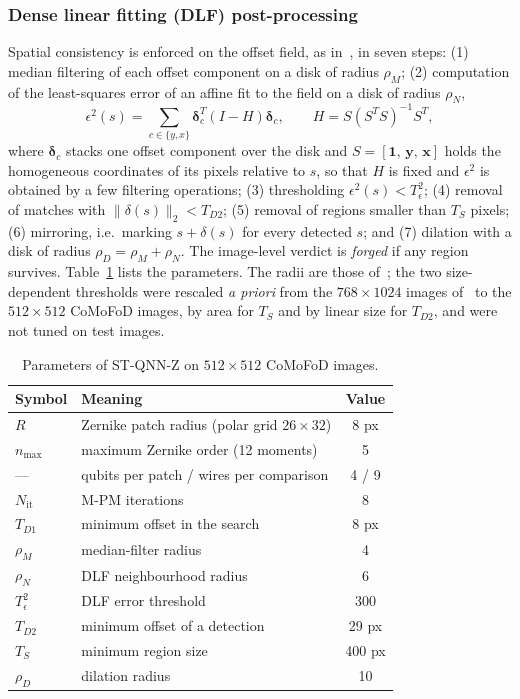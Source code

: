 \documentclass[conference]{IEEEtran}
\begin{document}
\subsubsection{Dense linear fitting (DLF) post-processing}
Spatial consistency is enforced on the offset field, as in~\cite{cozzolino2015}, in seven steps: (1) median filtering of each offset component on a disk of radius $\rho_M$; (2) computation of the least-squares error of an affine fit to the field on a disk of radius $\rho_N$,
\begin{equation}
\epsilon^2(s) = \sum_{c\in\{y,x\}} \boldsymbol{\delta}_c^{T}\left(I - H\right)\boldsymbol{\delta}_c,\qquad H = S\left(S^TS\right)^{-1}S^T,
\label{eq:dlf}
\end{equation}
where $\boldsymbol{\delta}_c$ stacks one offset component over the disk and $S = [\mathbf{1},\, \mathbf{y},\, \mathbf{x}]$ holds the homogeneous coordinates of its pixels relative to $s$, so that $H$ is fixed and $\epsilon^2$ is obtained by a few filtering operations; (3) thresholding $\epsilon^2(s) < T_\epsilon^2$; (4) removal of matches with $\|\delta(s)\|_2 < T_{D2}$; (5) removal of regions smaller than $T_S$ pixels; (6) mirroring, i.e.\ marking $s+\delta(s)$ for every detected $s$; and (7) dilation with a disk of radius $\rho_D = \rho_M + \rho_N$. The image-level verdict is \emph{forged} if any region survives. Table~\ref{tab:zparams} lists the parameters. The radii are those of~\cite{cozzolino2015}; the two size-dependent thresholds were rescaled \emph{a priori} from the $768\times1024$ images of~\cite{cozzolino2015} to the $512\times512$ CoMoFoD images, by area for $T_S$ and by linear size for $T_{D2}$, and were not tuned on test images.

\begin{table}[t]
\centering
\caption{Parameters of ST-QNN-Z on $512\times512$ CoMoFoD images.}
\label{tab:zparams}
\begin{tabular}{llc}
\toprule
\textbf{Symbol} & \textbf{Meaning} & \textbf{Value}\\
\midrule
$R$ & Zernike patch radius (polar grid $26\times32$) & 8 px\\
$n_{\max}$ & maximum Zernike order (12 moments) & 5\\
--- & qubits per patch / wires per comparison & 4 / 9\\
$N_{\mathrm{it}}$ & M-PM iterations & 8\\
$T_{D1}$ & minimum offset in the search & 8 px\\
$\rho_M$ & median-filter radius & 4\\
$\rho_N$ & DLF neighbourhood radius & 6\\
$T_\epsilon^2$ & DLF error threshold & 300\\
$T_{D2}$ & minimum offset of a detection & 29 px\\
$T_S$ & minimum region size & 400 px\\
$\rho_D$ & dilation radius & 10\\
\bottomrule
\end{tabular}
\end{table}
\end{document}
